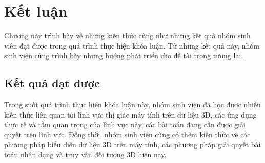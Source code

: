 \chapter{Kết luận}
\begin{ChapAbstract}
Chương này trình bày về những kiến thức cũng như những kết quả nhóm sinh
viên đạt được trong quá trình thực hiện khóa luận. Từ những kết quả này,
nhóm sinh viên cũng trình bày những hướng phát triển cho đề tài trong
tương lai.
\end{ChapAbstract}
\section{Kết quả đạt được}
Trong suốt quá trình thực hiện khóa luận này, nhóm sinh viên đã học được nhiều kiến thức liên quan tới lĩnh vực thị giác máy tính trên dữ liệu 3D, các ứng dụng thực tế và tầm quan trọng của lĩnh vực này, các bài toán đang cần được giải quyết trên lĩnh vực. Đồng thời, nhóm sinh viên cũng có thêm kiến thức về các phương pháp biểu diễn dữ liệu 3D trên máy tính, các phương pháp giải quyết bài toán nhận dạng và truy vấn đối tượng 3D hiện nay. 

